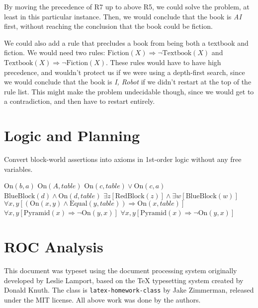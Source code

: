 \documentclass[11pt,largemargins, anonymous]{homework}
\begin{document}
By moving the precedence of R7 up to above R5, we could solve the problem,
at least in this particular instance.
Then, we would conclude that the book is \textit{AI} first,
without reaching the conclusion that the book could be fiction.

We could also add a rule that precludes a book from being both a textbook and fiction.
We would need two rules: $\mathrm{Fiction}(X) \Rightarrow \neg \mathrm{Textbook}(X)$ and $\mathrm{Textbook}(X) \Rightarrow \neg \mathrm{Fiction}(X)$. These rules would have to have high precedence,
and wouldn't protect us if we were using a depth-first search,
since we would conclude that the book is \textit{I, Robot} if we didn't restart at the top of the rule list.
This might make the problem undecidable though,
since we would get to a contradiction,
and then have to restart entirely.

\part{Logic and Planning}

\question

Convert block-world assertions into axioms in 1st-order logic
without any free variables.

\begin{arabicparts}

    \questionpart \( \mathrm{On}(b, a) \)
    \questionpart \( \mathrm{On}(A, table) \)
    \questionpart \( \mathrm{On}(c, table) \lor \mathrm{On}(c, a) \)
    \questionpart \( \mathrm{BlueBlock}(d) \land \mathrm{On}(d, table) \)
    \questionpart \( \exists z [\mathrm{RedBlock}(z)] \land \exists w [\mathrm{BlueBlock}(w)] \)
    \questionpart \( \forall x, y [(\mathrm{On}(x, y) \land \mathrm{Equal}(y, table)) \Rightarrow \mathrm{On}(x, table)] \)
    \questionpart \( \forall x, y [\mathrm{Pyramid}(x) \Rightarrow  \neg \mathrm{On}(y, x)] \)
    \questionpart \( \forall x, y [\mathrm{Pyramid}(x) \Rightarrow  \neg \mathrm{On}(y, x)] \)

\end{arabicparts}

\part{ROC Analysis}


\begin{colophon}
    This document was typeset using the \LaTeXe{} document processing system
    originally developed by Leslie Lamport, based on the \TeX{} typesetting system
    created by Donald Knuth.
    The class is \texttt{latex-homework-class} by Jake Zimmerman,
    released under the MIT license.
    All above work was done by the authors.
\end{colophon}
\end{document}

